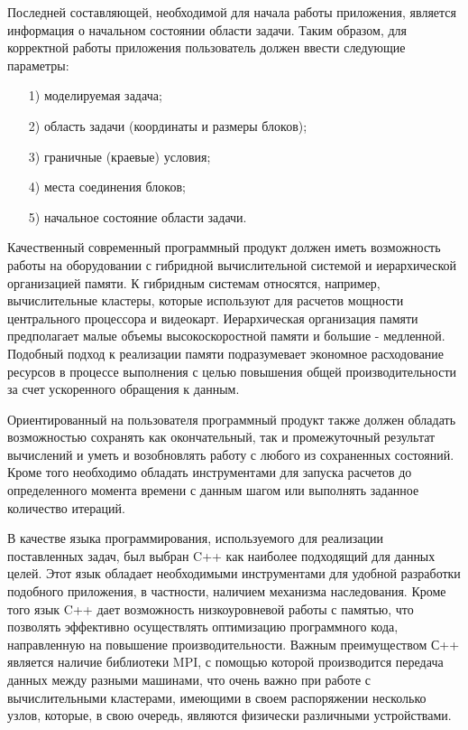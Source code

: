 \documentclass[a4paper, 14pt]{extarticle}
\theoremstyle{definition}
\begin{document}
\par Последней составляющей, необходимой для начала работы приложения, является информация о начальном состоянии области задачи. Таким образом, для корректной работы приложения пользователь должен ввести следующие параметры:
\begin{enumerate}
\item[1)] моделируемая задача;
\item[2)] область задачи (координаты и размеры блоков);
\item[3)] граничные (краевые) условия;
\item[4)] места соединения блоков;
\item[5)] начальное состояние области задачи.
\end{enumerate}

\par Качественный современный программный продукт должен иметь возможность работы на оборудовании с гибридной вычислительной системой и иерархической организацией памяти. К гибридным системам относятся, например, вычислительные кластеры, которые используют для расчетов мощности центрального процессора и видеокарт. Иерархическая организация памяти предполагает малые объемы высокоскоростной памяти и большие - медленной. Подобный подход к реализации памяти подразумевает экономное расходование ресурсов в процессе выполнения с целью повышения общей производительности за счет ускоренного обращения к данным.

\par Ориентированный на пользователя программный продукт также должен обладать возможностью сохранять как окончательный, так и промежуточный результат вычислений и уметь и возобновлять работу с любого из сохраненных состояний. Кроме того необходимо обладать инструментами для запуска расчетов до определенного момента времени с данным шагом или выполнять заданное количество итераций.

\par В качестве языка программирования, используемого для реализации поставленных задач, был выбран C++ как наиболее подходящий для данных целей. Этот язык обладает необходимыми инструментами для удобной разработки подобного приложения, в частности, наличием механизма наследования. Кроме того язык C++ дает возможность низкоуровневой работы с памятью, что позволять эффективно осуществлять оптимизацию программного кода, направленную на повышение производительности.  Важным преимуществом С++ является наличие библиотеки MPI, с помощью которой производится передача данных между разными машинами, что очень важно при работе с вычислительными кластерами, имеющими в своем распоряжении несколько узлов, которые, в свою очередь, являются физически различными устройствами.
\end{document}
